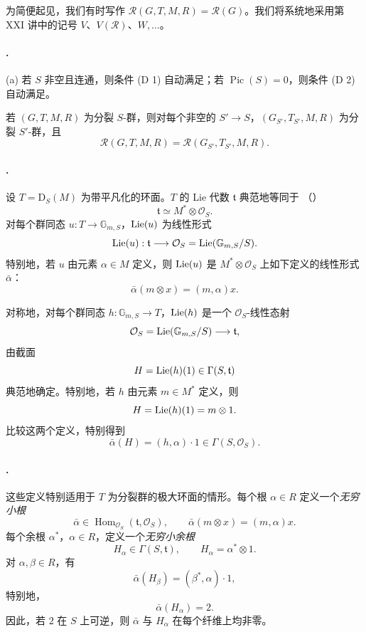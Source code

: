为简便起见，我们有时写作 \(\mathcal R(G,T,M,R)=\mathcal R(G)\)。我们将系统地采用第 XXI 讲中的记号 \(V\)、\(V(\mathcal R)\)、\(W,\ldots\)。

\paragraph{.}
\textup{(a)} 若 \(S\) 非空且连通，则条件 \textup{(D 1)} 自动满足；若 \(\operatorname{Pic}(S)=0\)，则条件 \textup{(D 2)} 自动满足。

\textup{} 若 \((G,T,M,R)\) 为分裂 \(S\)-群，则对每个非空的 \(S'\to S\)，\((G_{S'},T_{S'},M,R)\) 为分裂 \(S'\)-群，且
\[
  \mathcal R(G,T,M,R)
  =
  \mathcal R(G_{S'},T_{S'},M,R).
\]

\paragraph{.}
设 \(T=\mathrm D_S(M)\) 为带平凡化的环面。\(T\) 的 Lie 代数 \(\mathfrak t\) 典范地等同于 \textup{（）}
\[
  \mathfrak t\simeq M^*\otimes\mathcal O_S.
\]
对每个群同态 \(u:T\to\mathbb G_{m,S}\)，\(\operatorname{Lie}(u)\) 为线性形式
\[
  \operatorname{Lie}(u):
  \mathfrak t\longrightarrow
  \mathcal O_S=\operatorname{Lie}(\mathbb G_{m,S}/S).
\]
特别地，若 \(u\) 由元素 \(\alpha\in M\) 定义，则 \(\operatorname{Lie}(u)\) 是 \(M^*\otimes\mathcal O_S\) 上如下定义的线性形式 \(\bar\alpha\)：
\[
  \bar\alpha(m\otimes x)=(m,\alpha)x.
\]

对称地，对每个群同态 \(h:\mathbb G_{m,S}\to T\)，\(\operatorname{Lie}(h)\) 是一个 \(\mathcal O_S\)-线性态射
\[
  \mathcal O_S=\operatorname{Lie}(\mathbb G_{m,S}/S)
  \longrightarrow\mathfrak t,
\]
由截面
\[
  H=\operatorname{Lie}(h)(1)\in\Gamma(S,\mathfrak t)
\]
典范地确定。特别地，若 \(h\) 由元素 \(m\in M^*\) 定义，则
\[
  H=\operatorname{Lie}(h)(1)=m\otimes 1.
\]
比较这两个定义，特别得到
\[
  \bar\alpha(H)=(h,\alpha)\cdot 1
  \in\Gamma(S,\mathcal O_S).
\]

\paragraph{.}
这些定义特别适用于 \(T\) 为分裂群的极大环面的情形。每个根 \(\alpha\in R\) 定义一个\emph{无穷小根}
\[
  \bar\alpha\in
  \operatorname{Hom}_{\mathcal O_S}(\mathfrak t,\mathcal O_S),
  \qquad
  \bar\alpha(m\otimes x)=(m,\alpha)x.
\]
每个余根 \(\alpha^*\)，\(\alpha\in R\)，定义一个\emph{无穷小余根}
\[
  H_\alpha\in\Gamma(S,\mathfrak t),
  \qquad
  H_\alpha=\alpha^*\otimes 1.
\]
对 \(\alpha,\beta\in R\)，有
\[
  \bar\alpha(H_\beta)=(\beta^*,\alpha)\cdot 1,
\]
特别地，
\[
  \bar\alpha(H_\alpha)=2.
\]
因此，若 \(2\) 在 \(S\) 上可逆，则 \(\bar\alpha\) 与 \(H_\alpha\) 在每个纤维上均非零。

